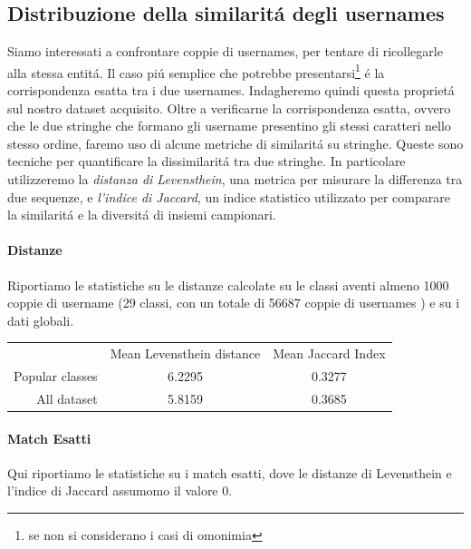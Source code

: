 \subsection{Distribuzione della similaritá degli usernames}
Siamo interessati a confrontare coppie di usernames, per tentare di ricollegarle alla stessa entitá. Il caso piú semplice che potrebbe presentarsi\footnote{se non si considerano i casi di omonimia} é la corrispondenza esatta tra i due usernames. Indagheremo quindi questa proprietá sul nostro dataset acquisito. Oltre a verificarne la corrispondenza esatta, ovvero che le due stringhe che formano gli username presentino gli stessi caratteri nello stesso ordine, faremo uso di alcune metriche di similaritá su stringhe. Queste sono tecniche per quantificare la dissimilaritá tra due stringhe. In particolare utilizzeremo la \textit{distanza di Levensthein}, una metrica per misurare la differenza tra due sequenze, e \textit{l'indice di Jaccard}, un indice statistico utilizzato per comparare la similaritá e la diversitá di insiemi campionari.

\paragraph{Distanze}
Riportiamo le statistiche su le distanze calcolate su le classi aventi almeno 1000 coppie di username (29 classi, con un totale di 56687 coppie di usernames ) e su i dati globali.
\newline

\begin{tabular}{ r|c|c| }
\multicolumn{1}{r}{}
 &  \multicolumn{1}{c}{Mean Levensthein distance}
 & \multicolumn{1}{c}{Mean Jaccard Index} \\
\cline{2-3}
Popular classes & 6.2295 & 0.3277\\
\cline{2-3}
All dataset & 5.8159 & 0.3685 \\
\cline{2-3}
\end{tabular}

\paragraph{Match Esatti} Qui riportiamo le statistiche su i match esatti, dove le distanze di Levensthein e l'indice di Jaccard assumomo il valore 0.
\newline

